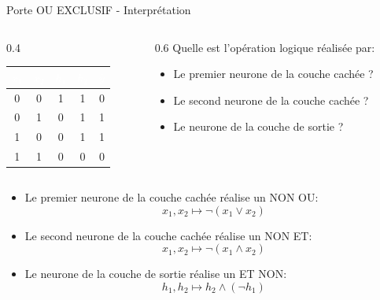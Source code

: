 \begin{frame}{Porte OU EXCLUSIF - Interprétation}
	\begin{columns}
		\begin{column}{0.4\textwidth}
			\begin{table}
				\centering
				\renewcommand{\arraystretch}{1.3} 
				\begin{tabular}{|c|c|c|c|c|}
					\hline
					\rowcolor{blue!80!black} %
					\textcolor{white}{\textbf{$x_1$}} & 
					\textcolor{white}{\textbf{$x_2$}} & 
					\textcolor{white}{\textbf{$h_1$}} & 
					\textcolor{white}{\textbf{$h_2$}} & 
					\textcolor{white}{\textbf{$\hat{y}$}} \\
					\hline
					0 & 0 & 1 & 1 & 0 \\
					\hline
					0 & 1 & 0 & 1 & 1 \\
					\hline
					1 & 0 & 0 & 1 & 1 \\
					\hline
					1 & 1 & 0 & 0 & 0 \\
					\hline
				\end{tabular}
			\end{table}
		\end{column}
		\begin{column}{0.6\textwidth}
			Quelle est l'opération logique réalisée par:
			\begin{itemize}
				\item Le premier neurone de la couche cachée ?
				\item Le second neurone de la couche cachée ?
				\item Le neurone de la couche de sortie ?
			\end{itemize}
		\end{column}
	\end{columns}

	\pause
	\vspace{0.3cm}
	
	\begin{itemize}
		\item Le premier neurone de la couche cachée réalise un NON OU:
		\begin{equation*}
			x_1, x_2 \mapsto \neg \left(x_1 \lor x_2\right)
		\end{equation*}
		\item Le second neurone de la couche cachée réalise un NON ET:
		\begin{equation*}
			x_1, x_2 \mapsto \neg \left(x_1 \land x_2\right)
		\end{equation*}
		\item Le neurone de la couche de sortie réalise un ET NON: 
		\begin{equation*}
			h_1, h_2 \mapsto h_2 \land \left(\neg h_1 \right)
		\end{equation*}
	\end{itemize}

\end{frame}

